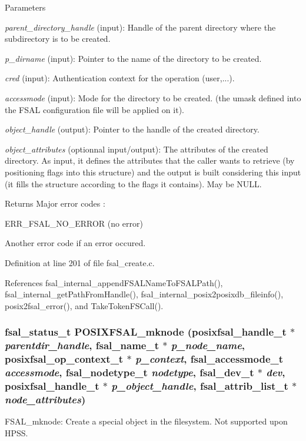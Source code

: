 \begin{DoxyParams}{Parameters}
\item[{\em parent\_\-directory\_\-handle}](input): Handle of the parent directory where the subdirectory is to be created. \item[{\em p\_\-dirname}](input): Pointer to the name of the directory to be created. \item[{\em cred}](input): Authentication context for the operation (user,...). \item[{\em accessmode}](input): Mode for the directory to be created. (the umask defined into the FSAL configuration file will be applied on it). \item[{\em object\_\-handle}](output): Pointer to the handle of the created directory. \item[{\em object\_\-attributes}](optionnal input/output): The attributes of the created directory. As input, it defines the attributes that the caller wants to retrieve (by positioning flags into this structure) and the output is built considering this input (it fills the structure according to the flags it contains). May be NULL.\end{DoxyParams}
\begin{DoxyReturn}{Returns}
Major error codes :
\begin{DoxyItemize}
\item ERR\_\-FSAL\_\-NO\_\-ERROR (no error)
\item Another error code if an error occured. 
\end{DoxyItemize}
\end{DoxyReturn}


Definition at line 201 of file fsal\_\-create.c.

References fsal\_\-internal\_\-appendFSALNameToFSALPath(), fsal\_\-internal\_\-getPathFromHandle(), fsal\_\-internal\_\-posix2posixdb\_\-fileinfo(), posix2fsal\_\-error(), and TakeTokenFSCall().
\subsubsection[{POSIXFSAL\_\-mknode}]{\setlength{\rightskip}{0pt plus 5cm}fsal\_\-status\_\-t POSIXFSAL\_\-mknode (posixfsal\_\-handle\_\-t $\ast$ {\em parentdir\_\-handle}, \/  fsal\_\-name\_\-t $\ast$ {\em p\_\-node\_\-name}, \/  posixfsal\_\-op\_\-context\_\-t $\ast$ {\em p\_\-context}, \/  fsal\_\-accessmode\_\-t {\em accessmode}, \/  fsal\_\-nodetype\_\-t {\em nodetype}, \/  fsal\_\-dev\_\-t $\ast$ {\em dev}, \/  posixfsal\_\-handle\_\-t $\ast$ {\em p\_\-object\_\-handle}, \/  fsal\_\-attrib\_\-list\_\-t $\ast$ {\em node\_\-attributes})}\label{fsal__create_8c_a0ac282be2b81af55f6d7a0a27842557d}
FSAL\_\-mknode: Create a special object in the filesystem. Not supported upon HPSS.

